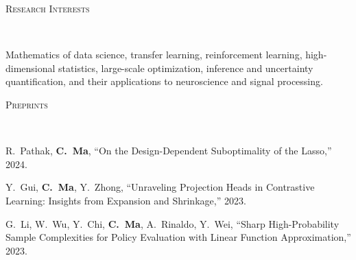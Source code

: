\documentclass[a4paper, 10pt]{article}
\newenvironment{changemargin}[2]{%
  \begin{list}{}{%
    \setlength{\topsep}{0pt}%
    \setlength{\leftmargin}{#1}%
    \setlength{\rightmargin}{#2}%
    \setlength{\listparindent}{\parindent}%
    \setlength{\itemindent}{\parindent}%
    \setlength{\parsep}{\parskip}%
  }%
  \item[]}{\end{list}
}
\newcommand{\lineover}{
	\begin{changemargin}{-0.05in}{-0.05in}
		\vspace*{-8pt}
		\hrulefill \\
		\vspace*{-2pt}
	\end{changemargin}
}
\newcommand{\header}[1]{
	\begin{changemargin}{-0.5in}{-0.5in}
		\scshape{#1}\\
  	\lineover
	\end{changemargin}
}
\newenvironment{body} {
	\vspace*{-16pt}
	\begin{changemargin}{-0.3in}{-0.5in}
  }	
	{\end{changemargin}
}
\begin{document}
\bigskip
\header{\LARGE{Research Interests}}
\begin{body}
\vspace{18pt}
Mathematics of data science, transfer learning, reinforcement learning, high-dimensional statistics, large-scale optimization, inference and uncertainty quantification, and their applications to neuroscience and signal processing.
\end{body}



\bigskip
\header{\LARGE{Preprints}}
\begin{body}
	\vspace{18pt}
	\begin{enumerate}[label={[{P}{{\arabic*}}]}]

\item R.~Pathak, \textbf{C.~Ma}, ``On the Design-Dependent Suboptimality of the Lasso,'' 2024.
\item Y.~Gui, \textbf{C.~Ma}, Y.~Zhong, ``Unraveling Projection Heads in Contrastive Learning: Insights from Expansion and Shrinkage,'' 2023.
\item G.~Li, W.~Wu, Y.~Chi, \textbf{C.~Ma}, A.~Rinaldo, Y.~Wei, ``Sharp High-Probability Sample Complexities for Policy Evaluation with Linear Function Approximation,'' 2023.










	\end{enumerate}
\end{body}
\end{document}
